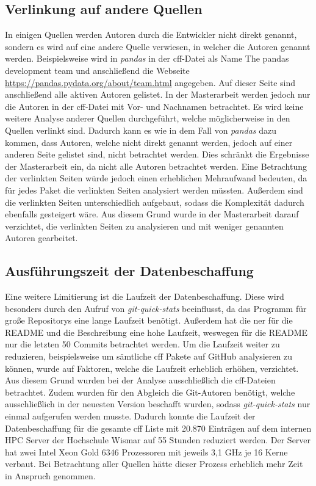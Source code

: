 \subsection*{Verlinkung auf andere Quellen}
\label{sec:verlinkung_auf_andere_quellen}
In einigen Quellen werden Autoren durch die Entwickler nicht direkt genannt, sondern es wird auf eine andere Quelle verwiesen, in welcher die Autoren genannt werden.
Beispielsweise wird in \emph{pandas} in der \gls{cff}-Datei als Name \glqq The pandas development team\grqq{} und anschließend die Webseite \url{https://pandas.pydata.org/about/team.html} angegeben.
Auf dieser Seite sind anschließend alle aktiven Autoren gelistet.
In der Masterarbeit werden jedoch nur die Autoren in der \gls{cff}-Datei mit Vor- und Nachnamen betrachtet.
Es wird keine weitere Analyse anderer Quellen durchgeführt, welche möglicherweise in den Quellen verlinkt sind.
Dadurch kann es wie in dem Fall von \emph{pandas} dazu kommen, dass Autoren, welche nicht direkt genannt werden, jedoch auf einer anderen Seite gelistet sind, nicht betrachtet werden.
Dies schränkt die Ergebnisse der Masterarbeit ein, da nicht alle Autoren betrachtet werden.
Eine Betrachtung der verlinkten Seiten würde jedoch einen erheblichen Mehraufwand bedeuten, da für jedes Paket die verlinkten Seiten analysiert werden müssten.
Außerdem sind die verlinkten Seiten unterschiedlich aufgebaut, sodass die Komplexität dadurch ebenfalls gesteigert wäre.
Aus diesem Grund wurde in der Masterarbeit darauf verzichtet, die verlinkten Seiten zu analysieren und mit weniger genannten Autoren gearbeitet.

\subsection*{Ausführungszeit der Datenbeschaffung}
\label{sec:ausfuehrungszeit_der_datenbeschaffung}
Eine weitere Limitierung ist die Laufzeit der Datenbeschaffung.
Diese wird besonders durch den Aufruf von \emph{git-quick-stats} beeinflusst, da das Programm für große Repositorys eine lange Laufzeit benötigt.
Außerdem hat die \gls{ner} für die README und die Beschreibung eine hohe Laufzeit, weswegen für die README nur die letzten 50 Commits betrachtet werden.
Um die Laufzeit weiter zu reduzieren, beispielsweise um sämtliche \gls{cff} Pakete auf GitHub analysieren zu können, wurde auf Faktoren, welche die Laufzeit erheblich erhöhen, verzichtet.
Aus diesem Grund wurden bei der Analyse ausschließlich die \gls{cff}-Dateien betrachtet.
Zudem wurden für den Abgleich die Git-Autoren benötigt, welche ausschließlich in der neuesten Version beschafft wurden, sodass \emph{git-quick-stats} nur einmal aufgerufen werden musste.
Dadurch konnte die Laufzeit der Datenbeschaffung für die gesamte \gls{cff} Liste mit 20.870 Einträgen auf dem internen HPC Server der Hochschule Wismar auf 55 Stunden reduziert werden.
Der Server hat zwei Intel Xeon Gold 6346 Prozessoren mit jeweils 3,1 GHz je 16 Kerne verbaut.
Bei Betrachtung aller Quellen hätte dieser Prozess erheblich mehr Zeit in Anspruch genommen.

